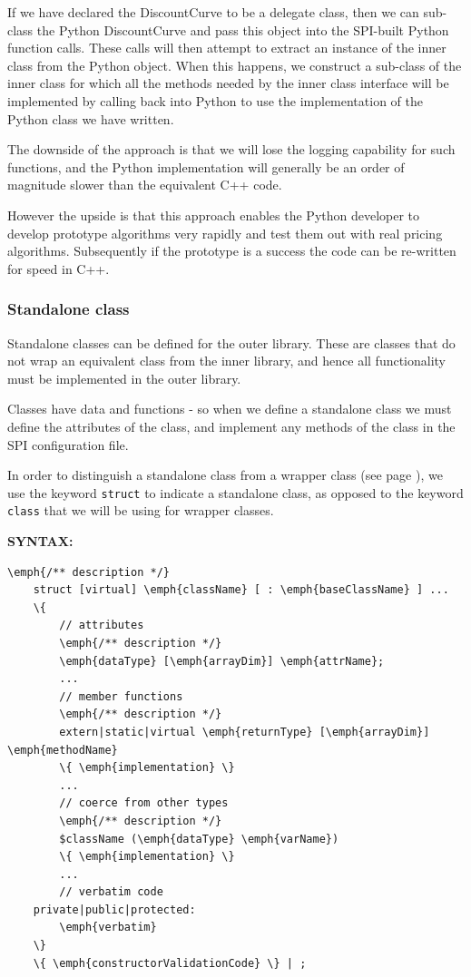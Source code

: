 If we have declared the DiscountCurve to be a delegate class, then we can sub-class the Python DiscountCurve and pass this object into the SPI-built Python function calls.
These calls will then attempt to extract an instance of the inner class from the Python object.
When this happens, we construct a sub-class of the inner class for which all the methods needed by the inner class interface will be implemented by calling back into Python to use the implementation of the Python class we have written.

The downside of the approach is that we will lose the logging capability for such functions, and the Python implementation will generally be an order of magnitude slower than the equivalent C++ code.

However the upside is that this approach enables the Python developer to develop prototype algorithms very rapidly and test them out with real pricing algorithms.
Subsequently if the prototype is a success the code can be re-written for speed in C++.

\newpage
\subsubsection{Standalone class} \label{struct}

Standalone classes can be defined for the outer library.
These are classes that do not wrap an equivalent class from the inner library, and hence all functionality must be implemented in the outer library.

Classes have data and functions - so when we define a standalone class we must define the attributes of the class, and implement any methods of the class in the SPI configuration file.

In order to distinguish a standalone class from a wrapper class (see page \pageref{class}), we use the keyword \texttt{struct} to indicate a standalone class, as opposed to the keyword \texttt{class} that we will be using for wrapper classes.

\textbf{SYNTAX:}
\nopagebreak
\begin{Verbatim}[commandchars=\\\{\}]
    \emph{/** description */}
    struct [virtual] \emph{className} [ : \emph{baseClassName} ] ...
    \{
        // attributes
        \emph{/** description */}
        \emph{dataType} [\emph{arrayDim}] \emph{attrName};
        ...
        // member functions
        \emph{/** description */}
        extern|static|virtual \emph{returnType} [\emph{arrayDim}] \emph{methodName}
        \{ \emph{implementation} \}
        ...
        // coerce from other types
        \emph{/** description */}
        $className (\emph{dataType} \emph{varName})
        \{ \emph{implementation} \}
        ...
        // verbatim code
    private|public|protected:
        \emph{verbatim}
    \}
    \{ \emph{constructorValidationCode} \} | ;
\end{Verbatim}

